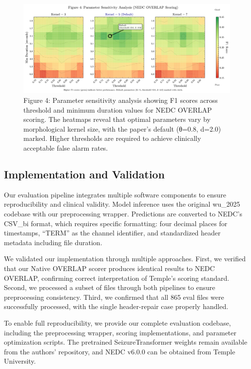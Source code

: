 \documentclass[
  10pt,
]{article}
\begin{document}
\begin{figure}
\hypertarget{fig:parameter-heatmap}{%
\centering
\includegraphics[width=1\textwidth,height=\textheight]{figures/fig4_parameter_heatmap_optimized.png}
\caption{Figure 4: Parameter sensitivity analysis showing F1 scores
across threshold and minimum duration values for NEDC OVERLAP scoring.
The heatmaps reveal that optimal parameters vary by morphological kernel
size, with the paper's default (θ=0.8, d=2.0) marked. Higher thresholds
are required to achieve clinically acceptable false alarm
rates.}\label{fig:parameter-heatmap}
}
\end{figure}

\hypertarget{implementation-and-validation}{%
\subsection{Implementation and
Validation}\label{implementation-and-validation}}

Our evaluation pipeline integrates multiple software components to
ensure reproducibility and clinical validity. Model inference uses the
original wu\_2025 codebase with our preprocessing wrapper. Predictions
are converted to NEDC's CSV\_bi format, which requires specific
formatting: four decimal places for timestamps, ``TERM'' as the channel
identifier, and standardized header metadata including file duration.

We validated our implementation through multiple approaches. First, we
verified that our Native OVERLAP scorer produces identical results to
NEDC OVERLAP, confirming correct interpretation of Temple's scoring
standard. Second, we processed a subset of files through both pipelines
to ensure preprocessing consistency. Third, we confirmed that all 865
eval files were successfully processed, with the single header-repair
case properly handled.

To enable full reproducibility, we provide our complete evaluation
codebase, including the preprocessing wrapper, scoring implementations,
and parameter optimization scripts. The pretrained SeizureTransformer
weights remain available from the authors' repository, and NEDC v6.0.0
can be obtained from Temple University.
\end{document}

